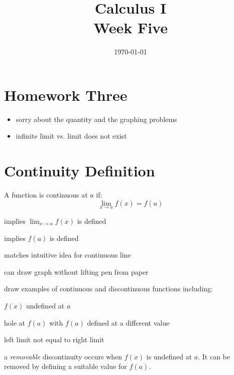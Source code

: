 \documentclass[letterpaper, landscape]{exam}
\author{}
\date{\today}
\title{Calculus I \\ Week Five}
\begin{document}
  \maketitle
  \tableofcontents

  \section{Homework Three} 
  \begin{itemize}
    \item sorry about the quantity and the graphing problems
    \item infinite limit vs. limit does not exist
  \end{itemize}

  \section{Continuity Definition}

  A function is continuous at $a$ if:
  \[
    \lim_{x \to a} f(x) = f(a) 
  \]

  \begin{itemize*}
    \item implies $\lim_{x \to a} f(x)$ is defined
    \item implies $f(a)$ is defined
    \item matches intuitive idea for continuous line
    \item can draw graph without lifting pen from paper
    \item draw examples of continuous and discontinuous functions including:
      \begin{itemize*}
        \item $f(x)$ undefined at $a$
        \item hole at $f(a)$ with $f(a)$ defined at a different value
        \item left limit not equal to right limit
      \end{itemize*}

    \item a {\em removable} discontinuity occurs when $f(x)$ is undefined at $a$. It can
      be removed by defining a suitable value for $f(a)$.

  \end{itemize*}
\end{document}
